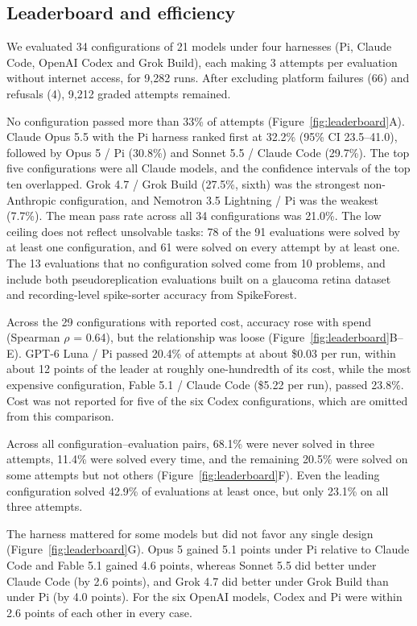 \subsection*{Leaderboard and efficiency}
We evaluated 34 configurations of 21 models under four harnesses (Pi, Claude Code, OpenAI Codex and Grok Build), each making 3 attempts per evaluation without internet access, for 9,282 runs. After excluding platform failures (66) and refusals (4), 9,212 graded attempts remained.

No configuration passed more than 33\% of attempts (Figure~\ref{fig:leaderboard}A). Claude Opus 5.5 with the Pi harness ranked first at 32.2\% (95\% CI \mbox{23.5--41.0}), followed by Opus 5 / Pi (30.8\%) and Sonnet 5.5 / Claude Code (29.7\%). The top five configurations were all Claude models, and the confidence intervals of the top ten overlapped. Grok 4.7 / Grok Build (27.5\%, sixth) was the strongest non-Anthropic configuration, and Nemotron 3.5 Lightning / Pi was the weakest (7.7\%). The mean pass rate across all 34 configurations was 21.0\%. The low ceiling does not reflect unsolvable tasks: 78 of the 91 evaluations were solved by at least one configuration, and 61 were solved on every attempt by at least one. The 13 evaluations that no configuration solved come from 10 problems, and include both pseudoreplication evaluations built on a glaucoma retina dataset and recording-level spike-sorter accuracy from SpikeForest.

Across the 29 configurations with reported cost, accuracy rose with spend (Spearman $\rho$ = 0.64), but the relationship was loose (\mbox{Figure~\ref{fig:leaderboard}B--E}). GPT-6 Luna / Pi passed 20.4\% of attempts at about \$0.03 per run, within about 12 points of the leader at roughly one-hundredth of its cost, while the most expensive configuration, Fable 5.1 / Claude Code (\$5.22 per run), passed 23.8\%. Cost was not reported for five of the six Codex configurations, which are omitted from this comparison.

 Across all configuration--evaluation pairs, 68.1\% were never solved in three attempts, 11.4\% were solved every time, and the remaining 20.5\% were solved on some attempts but not others (Figure~\ref{fig:leaderboard}F). Even the leading configuration solved 42.9\% of evaluations at least once, but only 23.1\% on all three attempts.

The harness mattered for some models but did not favor any single design (Figure~\ref{fig:leaderboard}G). Opus 5 gained 5.1 points under Pi relative to Claude Code and Fable 5.1 gained 4.6 points, whereas Sonnet 5.5 did better under Claude Code (by 2.6 points), and Grok 4.7 did better under Grok Build than under Pi (by 4.0 points). For the six OpenAI models, Codex and Pi were within 2.6 points of each other in every case.
